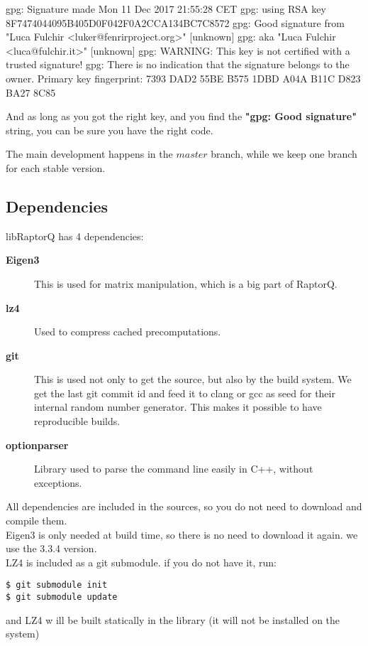 \documentclass[11pt,a4paper]{refart}
\begin{document}
\begin{verbbox}[\footnotesize]
 gpg: Signature made Mon 11 Dec 2017 21:55:28 CET
 gpg:                using RSA key 8F7474044095B405D0F042F0A2CCA134BC7C8572
 gpg: Good signature from "Luca Fulchir <luker@fenrirproject.org>" [unknown]
 gpg:                 aka "Luca Fulchir <luca@fulchir.it>" [unknown]
 gpg: WARNING: This key is not certified with a trusted signature!
 gpg:          There is no indication that the signature belongs to the owner.
 Primary key fingerprint: 7393 DAD2 55BE B575 1DBD A04A B11C D823 BA27 8C85
\end{verbbox}
\theverbbox

And as long as you got the right key, and you find the \textbf{"gpg: Good signature"} string,
you can be sure you have the right code.

The main development happens in the $master$ branch, while we keep one branch for each stable version.


\subsection{Dependencies}

libRaptorQ has 4 dependencies:
\begin{description}
\item[\textbf{Eigen3}] This is used for matrix manipulation, which is a big part of RaptorQ.
\item[\textbf{lz4}] Used to compress cached precomputations.
\item[\textbf{git}] This is used not only to get the source, but also by the build system. We get the last git commit id and feed it to clang or gcc as seed for their internal random number generator. This makes it possible to have reproducible builds.
\item[\textbf{optionparser}] Library used to parse the command line easily in C++, without exceptions.
\end{description}

All dependencies are included in the sources, so you do not need to download and compile them.\\
Eigen3 is only needed at build time, so there is no need to download it again. we use the 3.3.4 version.\\
LZ4 is included as a git submodule. if you do not have it, run:
\begin{verbatim}
$ git submodule init
$ git submodule update
\end{verbatim}
and LZ4 w
ill be built
 statically in the library (it will not be installed on the system)
\end{document}
